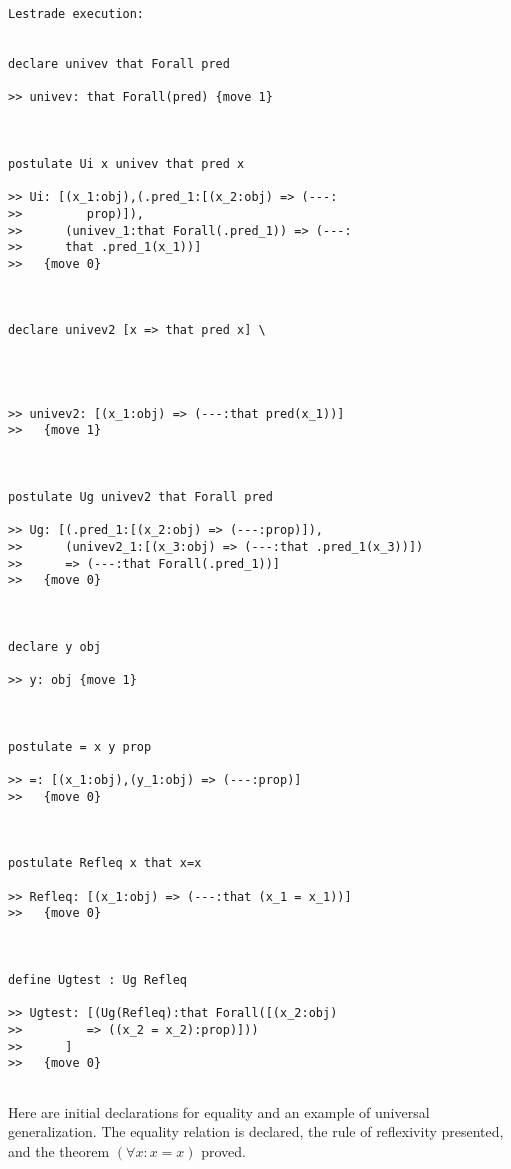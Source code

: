 \documentclass[12pt]{article}
\begin{document}
\begin{verbatim}Lestrade execution:


declare univev that Forall pred

>> univev: that Forall(pred) {move 1}



postulate Ui x univev that pred x

>> Ui: [(x_1:obj),(.pred_1:[(x_2:obj) => (---:
>>         prop)]),
>>      (univev_1:that Forall(.pred_1)) => (---:
>>      that .pred_1(x_1))]
>>   {move 0}



declare univev2 [x => that pred x] \
   



>> univev2: [(x_1:obj) => (---:that pred(x_1))]
>>   {move 1}



postulate Ug univev2 that Forall pred

>> Ug: [(.pred_1:[(x_2:obj) => (---:prop)]),
>>      (univev2_1:[(x_3:obj) => (---:that .pred_1(x_3))])
>>      => (---:that Forall(.pred_1))]
>>   {move 0}



declare y obj

>> y: obj {move 1}



postulate = x y prop

>> =: [(x_1:obj),(y_1:obj) => (---:prop)]
>>   {move 0}



postulate Refleq x that x=x

>> Refleq: [(x_1:obj) => (---:that (x_1 = x_1))]
>>   {move 0}



define Ugtest : Ug Refleq

>> Ugtest: [(Ug(Refleq):that Forall([(x_2:obj)
>>         => ((x_2 = x_2):prop)]))
>>      ]
>>   {move 0}


\end{verbatim}

Here are initial declarations for equality and an example of universal generalization.  The equality relation is declared, the rule of reflexivity presented, 
and the theorem $(\forall x:x=x)$ proved.
\end{document}
